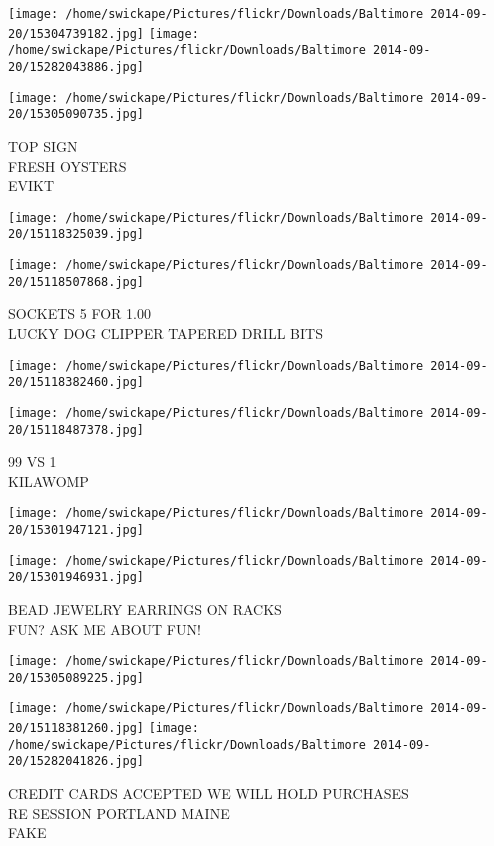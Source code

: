\documentclass[10pt,letterpaper]{article}
\begin{document}
\texttt{[image: /home/swickape/Pictures/flickr/Downloads/Baltimore 2014-09-20/15304739182.jpg]}
\texttt{[image: /home/swickape/Pictures/flickr/Downloads/Baltimore 2014-09-20/15282043886.jpg]}

\texttt{[image: /home/swickape/Pictures/flickr/Downloads/Baltimore 2014-09-20/15305090735.jpg]}

TOP SIGN\\
FRESH OYSTERS\\
EVIKT
\pagebreak

\texttt{[image: /home/swickape/Pictures/flickr/Downloads/Baltimore 2014-09-20/15118325039.jpg]}

\vspace{0.25in}
\texttt{[image: /home/swickape/Pictures/flickr/Downloads/Baltimore 2014-09-20/15118507868.jpg]}

SOCKETS 5 FOR 1.00\\
LUCKY DOG CLIPPER TAPERED DRILL BITS
\pagebreak

\texttt{[image: /home/swickape/Pictures/flickr/Downloads/Baltimore 2014-09-20/15118382460.jpg]}

\vspace{0.25in}
\texttt{[image: /home/swickape/Pictures/flickr/Downloads/Baltimore 2014-09-20/15118487378.jpg]}

99 VS 1\\
KILAWOMP
\pagebreak

\texttt{[image: /home/swickape/Pictures/flickr/Downloads/Baltimore 2014-09-20/15301947121.jpg]}

\vspace{0.25in}
\texttt{[image: /home/swickape/Pictures/flickr/Downloads/Baltimore 2014-09-20/15301946931.jpg]}

BEAD JEWELRY EARRINGS ON RACKS\\
FUN?  ASK ME ABOUT FUN!
\pagebreak

\texttt{[image: /home/swickape/Pictures/flickr/Downloads/Baltimore 2014-09-20/15305089225.jpg]}

\vspace{0.25in}
\texttt{[image: /home/swickape/Pictures/flickr/Downloads/Baltimore 2014-09-20/15118381260.jpg]}
\texttt{[image: /home/swickape/Pictures/flickr/Downloads/Baltimore 2014-09-20/15282041826.jpg]}

CREDIT CARDS ACCEPTED WE WILL HOLD PURCHASES\\
RE SESSION PORTLAND MAINE\\
FAKE
\pagebreak
\end{document}
